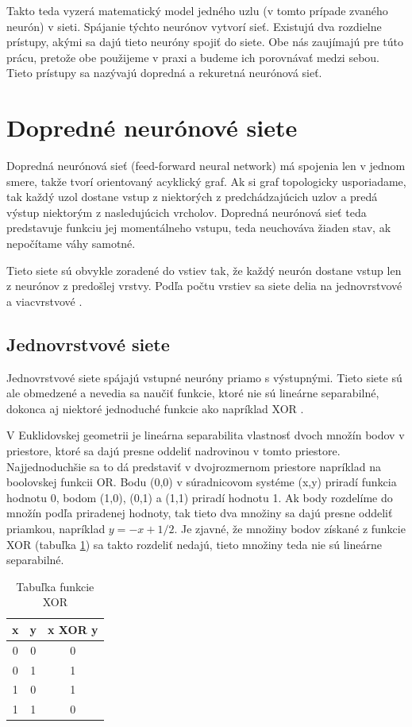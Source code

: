 Takto teda vyzerá matematický model jedného uzlu (v tomto prípade zvaného neurón) v sieti.
Spájanie týchto neurónov vytvorí sieť.
Existujú dva rozdielne prístupy, akými sa dajú tieto neuróny spojiť do siete. 
Obe nás zaujímajú pre túto prácu, pretože obe použijeme v praxi a budeme ich porovnávať medzi sebou. Tieto prístupy sa nazývajú dopredná a rekuretná neurónová sieť.

\section{Dopredné neurónové siete}
Dopredná neurónová sieť (feed-forward neural network) má spojenia len v jednom smere, takže tvorí orientovaný acyklický graf.
Ak si graf topologicky usporiadame, tak každý uzol dostane vstup z niektorých z predchádzajúcich uzlov a predá výstup niektorým z nasledujúcich vrcholov.
Dopredná neurónová sieť teda predstavuje funkciu jej momentálneho vstupu, teda neuchováva žiaden stav, ak nepočítame váhy samotné.

Tieto siete sú obvykle zoradené do vstiev tak, že každý neurón dostane vstup len z neurónov z predošlej vrstvy.
Podľa počtu vrstiev sa siete delia na jednovrstvové a viacvrstvové \citep{aima}.

\subsection{Jednovrstvové siete}
Jednovrstvové siete spájajú vstupné neuróny priamo s výstupnými.
Tieto siete sú ale obmedzené a nevedia sa naučiť funkcie, ktoré nie sú lineárne separabilné, dokonca aj niektoré jednoduché funkcie ako napríklad XOR \citep{aima}. 

V Euklidovskej geometrii je lineárna separabilita vlastnosť dvoch množín bodov v priestore, ktoré sa dajú presne oddeliť nadrovinou v tomto priestore. 
Najjednoduchšie sa to dá predstaviť v dvojrozmernom priestore napríklad na boolovskej funkcii OR. Bodu (0,0) v súradnicovom systéme (x,y) priradí funkcia hodnotu 0, bodom (1,0), (0,1) a (1,1) priradí hodnotu 1. Ak body rozdelíme do množín podľa priradenej hodnoty, tak tieto dva množiny sa dajú presne oddeliť priamkou, napríklad $y = -x + 1/2$. Je zjavné, že množiny bodov získané z funkcie XOR (tabuľka \ref{xor}) sa takto rozdeliť nedajú, tieto množiny teda nie sú lineárne separabilné.

\begin{table}[h]
\begin{center}
\begin{tabular}{ |c|c|c| } 
 \hline 
 x & y & x XOR y \\ 
 \hline
 0 & 0 & 0 \\ 
 0 & 1 & 1 \\ 
 1 & 0 & 1 \\ 
 1 & 1 & 0 \\ 
 \hline
\end{tabular}
\caption{Tabuľka funkcie XOR}
\label{xor}
\end{center}
\end{table}

